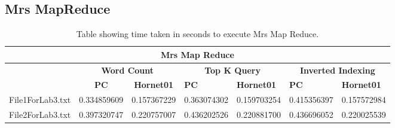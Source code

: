 \documentclass[10pt, twocolumn]{article}
\begin{document}
\subsection{Mrs MapReduce}
\label{app:MrsResults}
%
\begin{table}[H]
\centering
\caption{Table showing time taken in seconds to execute Mrs Map Reduce.}
\label{tbl:MrsMapReduceResults}
\begin{tabular}{|l|l|l|l|l|l|l|}
\hline
\multicolumn{7}{|c|}{\textbf{Mrs Map Reduce}}                                                                                                                                                               \\ \hline
\multicolumn{1}{|c|}{\textbf{}}   & \multicolumn{2}{c|}{\textbf{Word Count}}                                  & \multicolumn{2}{c|}{\textbf{Top K Query}} & \multicolumn{2}{c|}{\textbf{Inverted Indexing}} \\ \hline
 & \multicolumn{1}{c|}{\textbf{PC}} & \multicolumn{1}{c|}{\textbf{Hornet01}} & \textbf{PC}      & \textbf{Hornet01}      & \textbf{PC}         & \textbf{Hornet01}         \\ \cline{1-7} 
File1ForLab3.txt                                  & 0.334859609                      & 0.157367229                            & 0.363074302      & 0.159703254            & 0.415356397         & 0.157572984               \\ \hline
File2ForLab3.txt                  & 0.397320747                      & 0.220757007                            & 0.436202526      & 0.220881700            & 0.436696052         & 0.220025539               \\ \hline
\end{tabular}
\end{table} 
\end{document}
